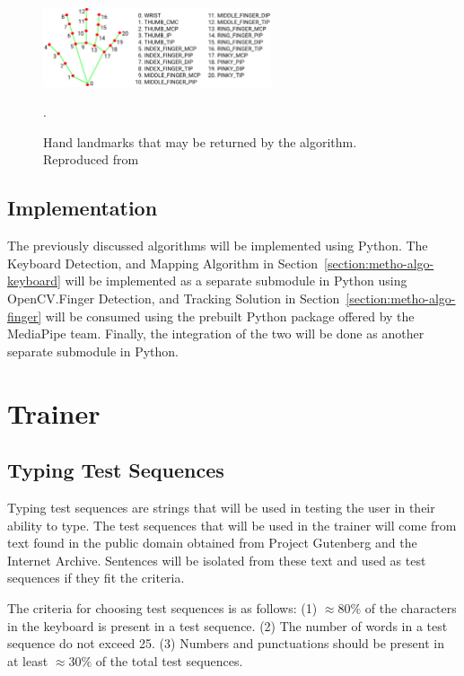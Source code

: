 \documentclass{report}
\begin{document}
\begin{figure}[H]
	\centering
	\includegraphics[width=0.6\textwidth]{hand-landmarks.png}
	\caption{Hand landmarks that may be returned by the algorithm. Reproduced from }.
	\label{fig:metho-algo-integration-landmarks}
	\centering
\end{figure}

\subsection{Implementation}
\label{section:metho-algo-implementation}
The previously discussed algorithms will be implemented using Python. The
Keyboard Detection, and Mapping Algorithm in
Section~\ref{section:metho-algo-keyboard} will be implemented as a separate
submodule in Python using OpenCV.\@The Finger Detection, and Tracking Solution
in Section~\ref{section:metho-algo-finger} will be consumed using the prebuilt
Python package offered by the MediaPipe team. Finally, the integration of the
two will be done as another separate submodule in Python.

\section{Trainer}

\subsection{Typing Test Sequences}
Typing test sequences are strings that will be used in testing the user in their
ability to type. The test sequences that will be used in the trainer will come
from text found in the public domain obtained from Project Gutenberg and the
Internet Archive. Sentences will be isolated from these text and used as test
sequences if they fit the criteria.

The criteria for choosing test sequences is as follows: (1) $\approx80\%$ of the
characters in the keyboard is present in a test sequence. (2) The number of
words in a test sequence do not exceed 25. (3) Numbers and punctuations should
be present in at least $\approx30\%$ of the total test sequences.
\end{document}
